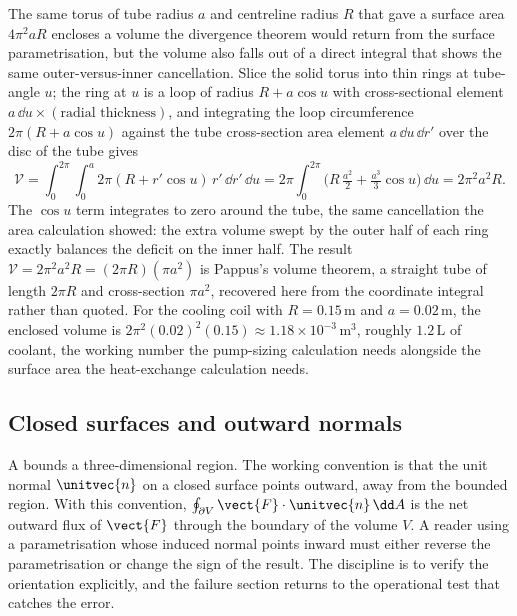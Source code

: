 \begin{example}
The same torus of tube radius $a$ and centreline radius $R$ that gave
a surface area $4\pi^{2}aR$ encloses a volume the divergence theorem
would return from the surface parametrisation, but the volume also
falls out of a direct integral that shows the same outer-versus-inner
cancellation. Slice the solid torus into thin rings at tube-angle $u$;
the ring at $u$ is a loop of radius $R + a\cos u$ with cross-sectional
element $a\,\dd u \times (\text{radial thickness})$, and integrating
the loop circumference $2\pi(R + a\cos u)$ against the tube
cross-section area element $a\,\dd u\,\dd r'$ over the disc of the tube
gives
\[
\mathcal{V} = \int_{0}^{2\pi}\!\int_{0}^{a} 2\pi(R + r'\cos u)\,r'\,
\dd r'\,\dd u = 2\pi\int_{0}^{2\pi}\Big(R\,\tfrac{a^{2}}{2} +
\tfrac{a^{3}}{3}\cos u\Big)\,\dd u = 2\pi^{2}a^{2}R.
\]
The $\cos u$ term integrates to zero around the tube, the same
cancellation the area calculation showed: the extra volume swept by
the outer half of each ring exactly balances the deficit on the inner
half. The result $\mathcal{V} = 2\pi^{2}a^{2}R = (2\pi R)(\pi a^{2})$
is Pappus's volume theorem, a straight tube of length $2\pi R$ and
cross-section $\pi a^{2}$, recovered here from the coordinate integral
rather than quoted. For the cooling coil with $R = 0.15\,\si{\meter}$
and $a = 0.02\,\si{\meter}$, the enclosed volume is
$2\pi^{2}(0.02)^{2}(0.15) \approx 1.18\times 10^{-3}\,\si{\meter
\cubed}$, roughly $1.2\,\si{\liter}$ of coolant, the working number
the pump-sizing calculation needs alongside the surface area the
heat-exchange calculation needs.
\end{example}

\subsection{Closed surfaces and outward normals}

A  bounds a three-dimensional region. The
working convention is that the unit normal $\unitvec{n}$ on a closed
surface points outward, away from the bounded region. With this
convention, $\oint_{\partial V} \vect{F} \cdot \unitvec{n} \,\dd A$ is
the net outward flux of $\vect{F}$ through the boundary of the
volume $V$. A reader using a parametrisation whose induced normal
points inward must either reverse the parametrisation or change the
sign of the result. The discipline is to verify the orientation
explicitly, and the failure section returns to the operational test
that catches the error.

